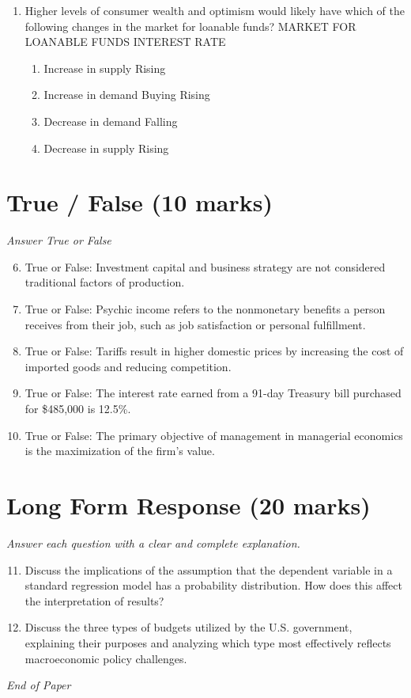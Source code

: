 \documentclass[12pt]{article}
\begin{document}
\begin{enumerate}[label=\arabic*.]
\begin{enumerate}[label=(\alph*)]
    \item 14\%
    \item 12\%
    \item 11\%
    \item 9\%
    \item 2\%
\end{enumerate}
\item Higher levels of consumer wealth and optimism would likely have which of the following changes in the market for loanable funds? MARKET FOR LOANABLE FUNDS INTEREST RATE
\begin{enumerate}[label=(\alph*)]
    \item Increase in supply Rising
    \item Increase in demand Buying Rising
    \item Decrease in demand Falling
    \item Decrease in supply Rising
\end{enumerate}
\end{enumerate}

\section*{True / False (10 marks)}
\textit{Answer True or False}
\begin{enumerate}[label=\arabic*.]
\setcounter{enumi}{5}
\item True or False: Investment capital and business strategy are not considered traditional factors of production.
\item True or False: Psychic income refers to the nonmonetary benefits a person receives from their job, such as job satisfaction or personal fulfillment.
\item True or False: Tariffs result in higher domestic prices by increasing the cost of imported goods and reducing competition.
\item True or False: The interest rate earned from a 91-day Treasury bill purchased for \$485,000 is 12.5\%.
\item True or False: The primary objective of management in managerial economics is the maximization of the firm's value.
\end{enumerate}

\section*{Long Form Response (20 marks)}
\textit{Answer each question with a clear and complete explanation.}
\begin{enumerate}[label=\arabic*.]
\setcounter{enumi}{10}
\item Discuss the implications of the assumption that the dependent variable in a standard regression model has a probability distribution. How does this affect the interpretation of results?
\item Discuss the three types of budgets utilized by the U.S. government, explaining their purposes and analyzing which type most effectively reflects macroeconomic policy challenges.
\end{enumerate}

\vfill
\noindent\textit{End of Paper}
\end{document}

